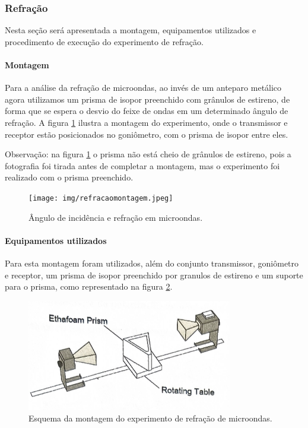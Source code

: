 \documentclass[12pt]{article}
\begin{document}
\subsubsection{Refração}
Nesta seção será apresentada a montagem, equipamentos utilizados e
procedimento de execução do experimento de refração.

\paragraph{Montagem}
Para a análise da refração de microondas, ao invés de um anteparo
metálico agora utilizamos um prisma de isopor preenchido com grânulos
de estireno, de forma que se espera o desvio do feixe de ondas em um
determinado ângulo de refração. A figura \ref{fig:img/refracaomontagem.jpeg}
ilustra a montagem do experimento, onde o transmissor e receptor
estão posicionados no goniômetro, com o prisma de isopor entre eles.

Observação: na figura
\ref{fig:img/refracaomontagem.jpeg} o prisma não está
cheio de grânulos de estireno, pois a fotografia foi tirada antes
de completar a montagem, mas o experimento foi realizado com o prisma
preenchido.

\begin{figure}[H]
  \centering
  \texttt{[image: img/refracaomontagem.jpeg]}
  \caption{Ângulo de incidência e refração em microondas.}
  \label{fig:img/refracaomontagem.jpeg}
\end{figure}

\paragraph{Equipamentos utilizados}
Para esta montagem foram utilizados, além do conjunto transmissor,
goniômetro e receptor, um prisma de isopor preenchido por granulos de
estireno e um suporte para o prisma, como representado na figura
\ref{fig:img/refracaoesquema.png}.

\begin{figure}[H]
  \centering
  \includegraphics[width=0.8\textwidth]{img/refracaoesquema.png}
  \caption{Esquema da montagem do experimento de refração de microondas.}
  \label{fig:img/refracaoesquema.png}
\end{figure}
\end{document}
